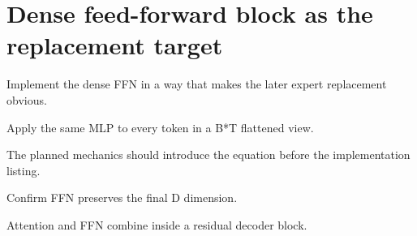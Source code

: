 \section{Dense feed-forward block as the replacement target}
\label{sec:ch02-dense-feed-forward-block-as-the-replacement-target}

Implement the dense FFN in a way that makes the later expert replacement obvious.



Apply the same MLP to every token in a B*T flattened view.



The planned mechanics should introduce the equation before the implementation listing.





\begin{checkpointbox}
Confirm FFN preserves the final D dimension.
\end{checkpointbox}

Attention and FFN combine inside a residual decoder block.
